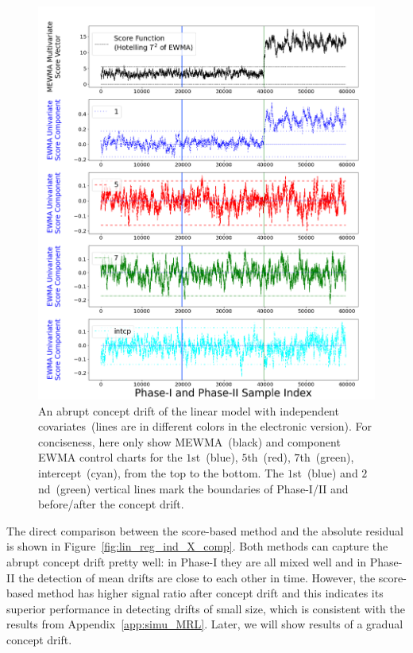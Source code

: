 \documentclass[twoside,11pt]{article}
\begin{document}
\begin{appendices}
\begin{figure}[!hpt]
\centering
  \includegraphics[width = 0.8\linewidth]{../figures/v14/sim_2/reg/neg_single_1_sim2_mlines_with_regu_1e-08_0_005.png}
  \caption{An abrupt concept drift of the linear model with independent covariates~(lines are in different colors in the electronic version). For conciseness, here only show MEWMA~(black) and component EWMA control charts for the $1$st~(blue), $5$th~(red), $7$th~(green), intercept~(cyan), from the top to the bottom. The $1$st~(blue) and $2$nd~(green) vertical lines mark the boundaries of Phase-I/II and before/after the concept drift.}
  \label{fig:lin_reg_ind_X}
\end{figure}

The direct comparison between the score-based method and the absolute residual is shown in Figure~\ref{fig:lin_reg_ind_X_comp}. Both methods can capture the abrupt concept drift pretty well: in Phase-I they are all mixed well and in Phase-II the detection of mean drifts are close to each other in time. However, the score-based method has higher signal ratio after concept drift and this indicates its superior performance in detecting drifts of small size, which is consistent with the results from Appendix~\ref{app:simu_MRL}. Later, we will show results of a gradual concept drift.


\end{appendices}
\end{document}
